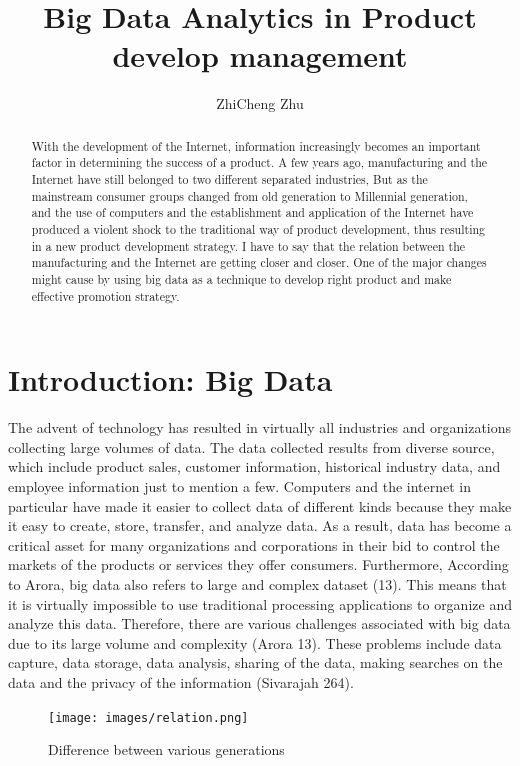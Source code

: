 \documentclass[sigconf]{acmart}
\begin{document}
\title{Big Data Analytics in Product develop management}


\author{ZhiCheng Zhu}


\begin{abstract}

    With the development of the Internet, information increasingly becomes an important factor in determining the success of a product. A few years ago, manufacturing and the Internet have still belonged to two different separated industries, But as the mainstream consumer groups changed from old generation to Millennial generation, and the use of computers and the establishment and application of the Internet have produced a violent shock to the traditional way of product development, thus resulting in a new product development strategy. I have to say that the relation between the manufacturing and the Internet are getting closer and closer. One of the major changes might cause by using big data as a technique to develop right product and make effective promotion strategy.
    
\end{abstract}


\maketitle

\section{Introduction: Big Data}
The advent of technology has resulted in virtually all industries and organizations collecting large volumes of data. The data collected results from diverse source, which include product sales, customer information, historical industry data, and employee information just to mention a few. Computers and the internet in particular have made it easier to collect data of different kinds because they make it easy to create, store, transfer, and analyze data. As a result, data has become a critical asset for many organizations and corporations in their bid to control the markets of the products or services they offer consumers. Furthermore, According to Arora, big data also refers to large and complex dataset (13). This means that it is virtually impossible to use traditional processing applications to organize and analyze this data. Therefore, there are various challenges associated with big data due to its large volume and complexity (Arora 13). These problems include data capture, data storage, data analysis, sharing of the data, making searches on the data and the privacy of the information (Sivarajah 264).
\begin{figure}[!ht]
  \centering\texttt{[image: images/relation.png]}
  \caption{Difference between various generations \cite{part-reg}}
  \label{Figure 3}
\end{figure}
\end{document}
